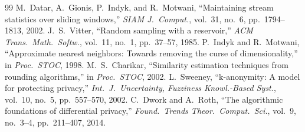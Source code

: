 \documentclass[conference]{IEEEtran}
\begin{document}
\begin{thebibliography}{99}
 M.~Datar, A.~Gionis, P.~Indyk, and R.~Motwani, ``Maintaining stream statistics over sliding windows,'' \emph{SIAM J.\ Comput.}, vol.~31, no.~6, pp.~1794--1813, 2002.
 J.~S.~Vitter, ``Random sampling with a reservoir,'' \emph{ACM Trans.\ Math.\ Softw.}, vol.~11, no.~1, pp.~37--57, 1985.
 P.~Indyk and R.~Motwani, ``Approximate nearest neighbors: Towards removing the curse of dimensionality,'' in \emph{Proc.\ STOC}, 1998.
 M.~S.~Charikar, ``Similarity estimation techniques from rounding algorithms,'' in \emph{Proc.\ STOC}, 2002.
 L.~Sweeney, ``k-anonymity: A model for protecting privacy,'' \emph{Int.\ J.\ Uncertainty, Fuzziness Knowl.-Based Syst.}, vol.~10, no.~5, pp.~557--570, 2002.
 C.~Dwork and A.~Roth, ``The algorithmic foundations of differential privacy,'' \emph{Found.\ Trends Theor.\ Comput.\ Sci.}, vol.~9, no.~3--4, pp.~211--407, 2014.
\end{thebibliography}
\end{document}
